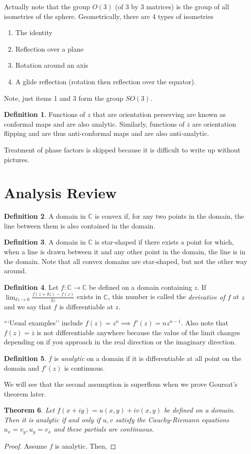 \documentclass[11pt,leqno,oneside]{amsart}
\newcommand{\C}{{\mathbb C}} %
\newtheorem{thm}{Theorem}[section]
\theoremstyle{definition}
\newtheorem{defn}[thm]{Definition}
\numberwithin{equation}{section}
\begin{document}
Actually note that the group $O(3)$ (of 3 by 3 matrices) is the group of all isometries of the sphere. Geometrically, there are 4 types of isometries 
\begin{enumerate}
    \item The identity
    \item Reflection over a plane
    \item Rotation around an axis
    \item A glide reflection (rotation then reflection over the equator).
\end{enumerate}
Note, just items 1 and 3 form the group $SO(3)$. 

\begin{defn}
    Functions of $z$ that are orientation perserving are known as conformal maps and are also analytic. Similarly, functions of $\overline{z}$ are orientation flipping and are thus anti-conformal maps and are also anti-analytic.
\end{defn}

Treatment of phase factors is skipped because it is difficult to write up without pictures.

\section*{Analysis Review}

\begin{defn}
A domain in $\C$ is convex if, for any two points in the domain, the line between them is also contained in the domain. 
\end{defn}
\begin{defn}
    A domain in $\C$ is star-shaped if there exists a point for which, when a line is drawn between it and any other point in the domain, the line is in the domain. Note that all convex domains are star-shaped, but not the other way around.
\end{defn}
\begin{defn}
    Let $f: \C \to \C$ be defined on a domain containing $z$. If $\lim_{\delta z \to 0} \frac{f(z+\delta z) - f(z)}{\delta z}$ exists in $\C$, this number is called the \emph{derivative of $f$} at $z$ and we say that $f$ is differentiable at $z$. 
\end{defn}

```Usual examples'' include $f(z) = z^n \implies f'(z) = nz^{n-1}$. Also note that $f(z) = \overline{z}$ is not differentiable anywhere because the value of the limit changes depending on if you approach in the real direction or the imaginary direction. 
\begin{defn}
    $f$ is \emph{analytic} on a domain if it is differentiable at all point on the domain and $f'(z)$ is continuous.
\end{defn}
We will see that the second assumption is superflous when we prove Goursat's theorem later.

\begin{thm}
    Let $f(x+iy) = u(x,y)+iv(x,y)$ be defined on a domain. Then it is analytic if and only if $u,v$ satisfy the Cauchy-Riemann equations $u_x = v_y, u_y = v_x$ and these partials are continuous. 
\end{thm}
\begin{proof}
    Assume $f$ is analytic. Then, 
\end{proof}
\end{document}
